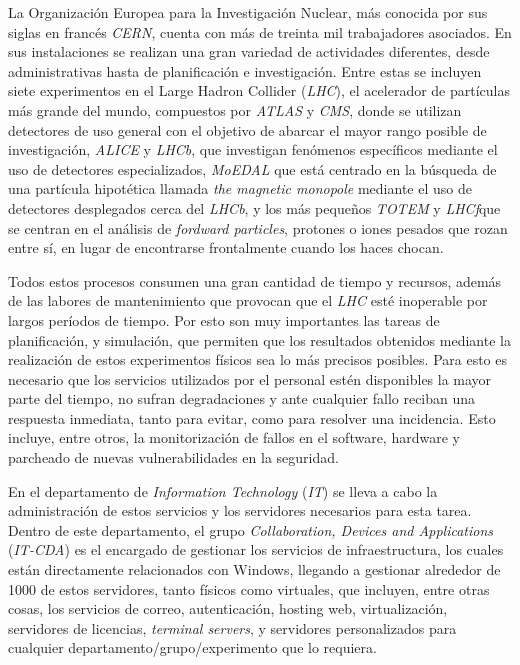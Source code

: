 \label{sec:int}


La Organización Europea para la Investigación Nuclear, más conocida por sus siglas en francés \textit{CERN}, cuenta con más de treinta mil trabajadores asociados. En sus instalaciones se realizan una gran variedad de actividades diferentes, desde administrativas hasta de planificación e investigación. Entre estas se incluyen siete experimentos en el Large Hadron Collider (\textit{LHC}), el acelerador de partículas más grande del mundo, compuestos por \textit{ATLAS} y \textit{CMS}, donde se utilizan detectores de uso general con el objetivo de abarcar el mayor rango posible de investigación, \textit{ALICE} y \textit{LHCb}, que investigan fenómenos específicos mediante el uso de detectores especializados, \textit{MoEDAL} que está centrado en la búsqueda de una partícula hipotética llamada \textit{the magnetic monopole} mediante el uso de detectores desplegados cerca del \textit{LHCb}, y los más pequeños \textit{TOTEM} y \textit{LHCf}que se centran en el análisis de \textit{fordward particles}, protones o iones pesados que rozan entre sí, en lugar de encontrarse frontalmente cuando los haces chocan. \cite{lhc}

Todos estos procesos consumen una gran cantidad de tiempo y recursos, además de las labores de mantenimiento que provocan que el \textit{LHC} esté inoperable por largos períodos de tiempo. Por esto son muy importantes las tareas de planificación,  y simulación, que permiten que los resultados obtenidos mediante la realización de estos experimentos físicos sea lo más precisos posibles. Para esto es necesario que los servicios utilizados por el personal estén disponibles la mayor parte del tiempo, no sufran degradaciones y ante cualquier fallo reciban una respuesta inmediata, tanto para evitar, como para resolver una incidencia. Esto incluye, entre otros, la monitorización de fallos en el software, hardware y parcheado de nuevas vulnerabilidades en la seguridad.

En el departamento de \textit{Information Technology} (\textit{IT}) se lleva a cabo la administración de estos servicios y los servidores necesarios para esta tarea. Dentro de este departamento, el grupo \textit{Collaboration, Devices and Applications} (\textit{IT-CDA}) es el encargado de gestionar los servicios de infraestructura, los cuales están directamente relacionados con Windows, llegando a gestionar alrededor de 1000 de estos servidores, tanto físicos como virtuales, que incluyen, entre otras cosas, los servicios de correo, autenticación, hosting web, virtualización, servidores de licencias, \textit{terminal servers}, y servidores personalizados para cualquier departamento/grupo/experimento que lo requiera. \cite{infraservicios,infrawindows}

